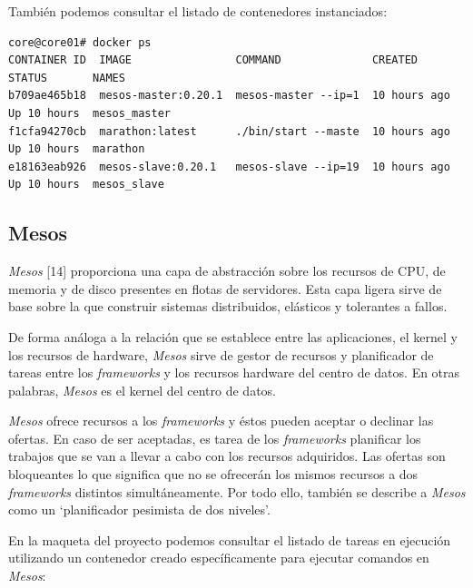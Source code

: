 \documentclass[a4paper,12pt,spanish,final]{epsc_tfc_pfc}
\begin{document}
También podemos consultar el listado de contenedores instanciados:\\

\begin{lstlisting}[style=dnsmasq]
core@core01# docker ps
CONTAINER ID  IMAGE                COMMAND              CREATED        STATUS       NAMES
b709ae465b18  mesos-master:0.20.1  mesos-master --ip=1  10 hours ago   Up 10 hours  mesos_master
f1cfa94270cb  marathon:latest      ./bin/start --maste  10 hours ago   Up 10 hours  marathon
e18163eab926  mesos-slave:0.20.1   mesos-slave --ip=19  10 hours ago   Up 10 hours  mesos_slave
\end{lstlisting}

\subsection{Mesos}

\emph{Mesos} [14] proporciona una capa de abstracción sobre los recursos de CPU, de memoria y de disco presentes en flotas de servidores. Esta capa ligera sirve de base sobre la que construir sistemas distribuidos, elásticos y tolerantes a fallos.

De forma análoga a la relación que se establece entre las aplicaciones, el kernel y los recursos de hardware, \emph{Mesos} sirve de gestor de recursos y planificador de tareas entre los \emph{frameworks} y los recursos hardware del centro de datos. En otras palabras, \emph{Mesos} es el kernel del centro de datos.

\emph{Mesos} ofrece recursos a los \emph{frameworks} y éstos pueden aceptar o declinar las ofertas. En caso de ser aceptadas, es tarea de los \emph{frameworks} planificar los trabajos que se van a llevar a cabo con los recursos adquiridos. Las ofertas son bloqueantes lo que significa que no se ofrecerán los mismos recursos a dos \emph{frameworks} distintos simultáneamente. Por todo ello, también se describe a \emph{Mesos} como un `planificador pesimista de dos niveles'.

En la maqueta del proyecto podemos consultar el listado de tareas en ejecución utilizando un contenedor creado específicamente para ejecutar comandos en \emph{Mesos}:\\
\end{document}
